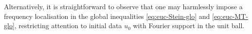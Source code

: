 \documentclass[10pt,a4paper]{amsart}
\numberwithin{equation}{section}
\newcommand{\dd}{\,\mathrm{d}}
\renewcommand{\leq}{\leqslant}
\renewcommand{\le}{\leqslant}
\renewcommand{\geq}{\geqslant}
\begin{document}
Alternatively, it is straightforward to observe that one may harmlessly impose a frequency localisation in the global inequalities \eqref{eq:euc-Stein-glo} and \eqref{eq:euc-MT-glo}, restricting attention to initial data $u_0$ with Fourier support in the unit ball.
\end{document}
